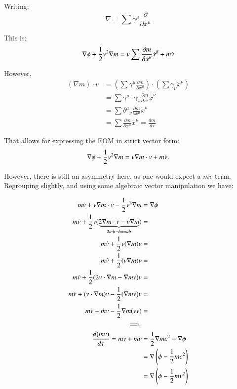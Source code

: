 \documentclass{article}      %
\newcommand{\grad}[0]{\nabla}
\newcommand{\PD}[2]{\frac{\partial {#2}}{\partial {#1}}}
\newcommand{\xdot}[0]{\dot{x}}
\newcommand{\vdot}[0]{\dot{v}}
\newcommand{\mdot}[0]{\dot{m}}
\begin{document}
Writing:
\begin{equation*}
\nabla = \sum \gamma^{\mu} \frac{\partial}{\partial x^{\mu}}
\end{equation*}

This is:
\begin{equation*}
\grad \phi + \inv{2} v^2 \grad m = v \sum \PD{x^{\beta}}{m} \xdot^{\beta} + m \vdot 
\end{equation*}

However, 
\begin{align*}
(\grad m) \cdot v 
&= 
\left(\sum \gamma^{\mu} \PD{x^{\mu}}{m}\right) \cdot \left( \sum \gamma_{\nu} \xdot^{\nu} \right) \\
&= \sum \gamma^{\mu} \cdot \gamma_{\nu} \PD{x^{\mu}}{m} \xdot^{\nu} \\
&= \sum {\delta^{\mu}}_{\nu} \PD{x^{\mu}}{m} \xdot^{\nu} \\
&= \sum \PD{x^{\mu}}{m} \xdot^{\mu} = \frac{dm}{d\tau}
\end{align*}

That allows for expressing the EOM in strict vector form:
\begin{equation}
\grad \phi + \inv{2} v^2 \grad m = v \grad m \cdot v + m \vdot.
\end{equation}

However, there is still an asymmetry here, as one would expect a $\mdot v$ term.  Regrouping slightly, and using some algebraic vector
manipulation we have:

\begin{align*}
m \vdot + v \grad m \cdot v - \inv{2} v^2 \grad m &= \grad \phi \\
m \vdot + \inv{2} v ( \underbrace{2 \grad m \cdot v - v \grad m}_{2 a \cdot b - b a = a b}) &= \\
m \vdot + \inv{2} v (\grad m) v &= \\
m \vdot + \inv{2} (v \grad m) v &= \\
m \vdot + \inv{2} (2 v \cdot \grad m - \grad m v) v &= \\
m \vdot + (v \cdot \grad m) v - \inv{2} (\grad m v) v &= \\
m \vdot + \mdot v - \inv{2} \grad m (v v) &= \\
\implies \\
\frac{d (m v)}{d\tau} = m \vdot + \mdot v
&= \inv{2} \grad m c^2 +\grad \phi \\
&= \grad \left(\phi - \inv{2} m c^2 \right) \\
&= \grad \left(\phi - \inv{2} m v^2 \right) \\
\end{align*}
\end{document}
